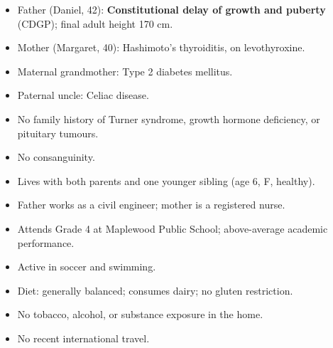 \documentclass[11pt,a4paper]{article}
\begin{document}
\vspace{3mm}

\begin{minipage}[t]{0.48\linewidth}
\begin{tcolorbox}[pednote,
  title={\faUsers\enspace Family History},
  height=55mm]
  \begin{itemize}[leftmargin=1.2em, itemsep=3pt, topsep=0pt, label={\color{PedBlue}\textbullet}]
    \item Father (Daniel, 42): \textbf{Constitutional delay of growth and puberty}
          (CDGP); final adult height 170 cm.
    \item Mother (Margaret, 40): Hashimoto's thyroiditis, on levothyroxine.
    \item Maternal grandmother: Type 2 diabetes mellitus.
    \item Paternal uncle: Celiac disease.
    \item No family history of Turner syndrome, growth hormone deficiency,
          or pituitary tumours.
    \item No consanguinity.
  \end{itemize}
\end{tcolorbox}
\end{minipage}\par
%
\begin{minipage}[t]{0.48\linewidth}
\hfill
\begin{tcolorbox}[pednote,
  title={\faHome\enspace Social History},
  height=55mm]
  \begin{itemize}[leftmargin=1.2em, itemsep=3pt, topsep=0pt, label={\color{PedBlue}\textbullet}]
    \item Lives with both parents and one younger sibling (age 6, F, healthy).
    \item Father works as a civil engineer; mother is a registered nurse.
    \item Attends Grade 4 at Maplewood Public School; above-average academic performance.
    \item Active in soccer and swimming.
    \item Diet: generally balanced; consumes dairy; no gluten restriction.
    \item No tobacco, alcohol, or substance exposure in the home.
    \item No recent international travel.
  \end{itemize}
\end{tcolorbox}
\end{minipage}
\end{document}
